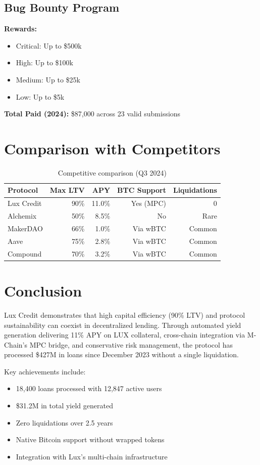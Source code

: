 \documentclass[11pt,a4paper]{article}
\begin{document}
\subsection{Bug Bounty Program}

\textbf{Rewards:}
\begin{itemize}
\item Critical: Up to \$500k
\item High: Up to \$100k
\item Medium: Up to \$25k
\item Low: Up to \$5k
\end{itemize}

\textbf{Total Paid (2024):} \$87,000 across 23 valid submissions

\section{Comparison with Competitors}

\begin{table}[h]
\centering
\small
\begin{tabular}{@{}lrrrr@{}}
\toprule
\textbf{Protocol} & \textbf{Max LTV} & \textbf{APY} & \textbf{BTC Support} & \textbf{Liquidations} \\ \midrule
Lux Credit & 90\% & 11.0\% & Yes (MPC) & 0 \\
Alchemix & 50\% & 8.5\% & No & Rare \\
MakerDAO & 66\% & 1.0\% & Via wBTC & Common \\
Aave & 75\% & 2.8\% & Via wBTC & Common \\
Compound & 70\% & 3.2\% & Via wBTC & Common \\ \bottomrule
\end{tabular}
\caption{Competitive comparison (Q3 2024)}
\end{table}

\section{Conclusion}

Lux Credit demonstrates that high capital efficiency (90\% LTV) and protocol sustainability can coexist in decentralized lending. Through automated yield generation delivering 11\% APY on LUX collateral, cross-chain integration via M-Chain's MPC bridge, and conservative risk management, the protocol has processed \$427M in loans since December 2023 without a single liquidation.

Key achievements include:
\begin{itemize}
\item 18,400 loans processed with 12,847 active users
\item \$31.2M in total yield generated
\item Zero liquidations over 2.5 years
\item Native Bitcoin support without wrapped tokens
\item Integration with Lux's multi-chain infrastructure
\end{itemize}
\end{document}
